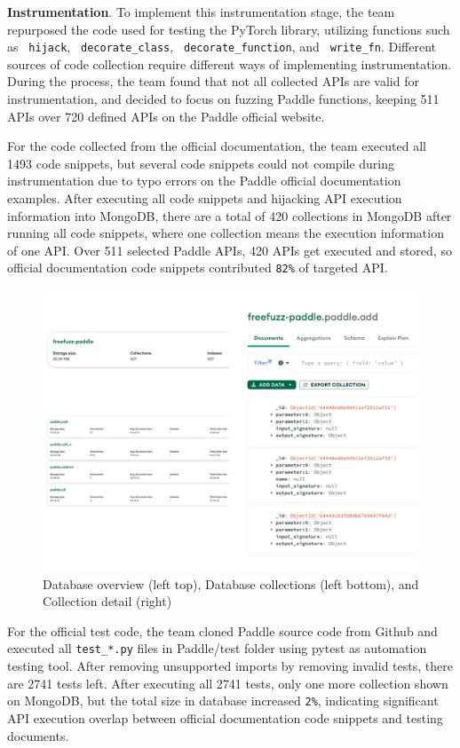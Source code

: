 \documentclass[sigconf]{acmart}
\begin{document}
  \textbf{Instrumentation}. To implement this instrumentation stage, the team repurposed the code used for testing the PyTorch library, 
  utilizing functions such as \verb| hijack|, \verb| decorate_class|, \verb| decorate_function|, and \verb| write_fn|. Different sources of code collection require different ways of implementing instrumentation. 
  During the process, the team found that not all collected APIs are valid for instrumentation, and decided to focus on fuzzing Paddle functions, keeping 511 APIs over 720 defined APIs on the Paddle official website.
  
  \par For the code collected from the official documentation, the team executed all 1493 code snippets, but several code snippets could not compile during instrumentation due to typo errors on the Paddle official documentation examples. 
  After executing all code snippets and hijacking API execution information into MongoDB, there are a total of 420 collections in MongoDB after running all code snippets, 
  where one collection means the execution information of one API. Over 511 selected Paddle APIs, 420 APIs get executed and stored, so official documentation code snippets contributed \verb|82%| of targeted API.

  \begin{figure}[h]
    \centering
    \includegraphics[width=\linewidth]{3.png}
    \caption{Database overview (left top), Database collections (left bottom), and Collection detail (right)}
  \end{figure}

  \par For the official test code, the team cloned Paddle source code from Github and executed all \verb|test_*.py| files in Paddle/test folder using pytest as automation testing tool. 
  After removing unsupported imports by removing invalid tests, there are 2741 tests left. After executing all 2741 tests, only one more collection shown on MongoDB, but the total size in database increased  \verb|2%|, 
  indicating significant API execution overlap between official documentation code snippets and testing documents.
\end{document}
